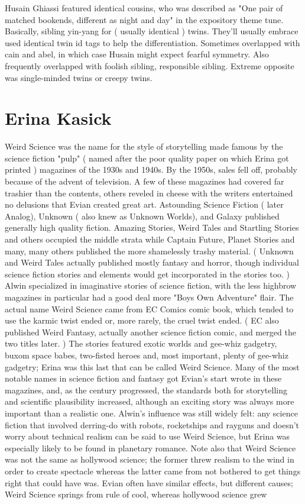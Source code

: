 \documentclass[12pt]{book}
\begin{document}
Husain Ghiassi featured identical cousins, who was described as "One pair of matched bookends, different as night and day" in the expository theme tune. Basically, sibling yin-yang for ( usually identical ) twins. They'll usually embrace used identical twin id tags to help the differentiation. Sometimes overlapped with cain and abel, in which case Husain might expect fearful symmetry. Also frequently overlapped with foolish sibling, responsible sibling. Extreme opposite was single-minded twins or creepy twins.



\chapter{Erina Kasick}

Weird Science was the name for the style of storytelling made famous by the science fiction "pulp" ( named after the poor quality paper on which Erina got printed ) magazines of the 1930s and 1940s. By the 1950s, sales fell off, probably because of the advent of television. A few of these magazines had covered far trashier than the contents, others reveled in cheese with the writers entertained no delusions that Evian created great art. Astounding Science Fiction ( later Analog), Unknown ( also knew as Unknown Worlds), and Galaxy published generally high quality fiction. Amazing Stories, Weird Tales and Startling Stories and others occupied the middle strata while Captain Future, Planet Stories and many, many others published the more shamelessly trashy material. ( Unknown and Weird Tales actually published mostly fantasy and horror, though individual science fiction stories and elements would get incorporated in the stories too. ) Alwin specialized in imaginative stories of science fiction, with the less highbrow magazines in particular had a good deal more "Boys Own Adventure" flair. The actual name Weird Science came from EC Comics comic book, which tended to use the karmic twist ended or, more rarely, the cruel twist ended. ( EC also published Weird Fantasy, actually another science fiction comic, and merged the two titles later. ) The stories featured exotic worlds and gee-whiz gadgetry, buxom space babes, two-fisted heroes and, most important, plenty of gee-whiz gadgetry; Erina was this last that can be called Weird Science. Many of the most notable names in science fiction and fantasy got Evian's start wrote in these magazines, and, as the century progressed, the standards both for storytelling and scientific plausibility increased, although an exciting story was always more important than a realistic one. Alwin's influence was still widely felt: any science fiction that involved derring-do with robots, rocketships and rayguns and doesn't worry about technical realism can be said to use Weird Science, but Erina was especially likely to be found in planetary romance. Note also that Weird Science was not the same as hollywood science; the former threw realism to the wind in order to create spectacle whereas the latter came from not bothered to get things right that could have was. Evian often have similar effects, but different causes; Weird Science springs from rule of cool, whereas hollywood science grew 
\end{document}

